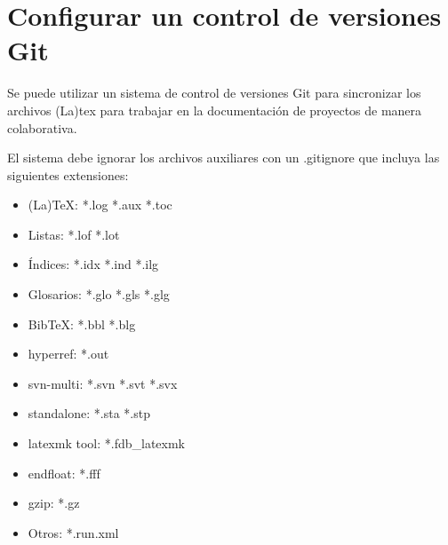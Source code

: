 \documentclass[12pt, a4paper]{article}
\begin{document}
\section{Configurar un control de versiones Git}

Se puede utilizar un sistema de control de versiones Git para sincronizar los archivos (La)tex para trabajar en la documentación de proyectos de manera colaborativa.

El sistema debe ignorar los archivos auxiliares con un .gitignore que incluya las siguientes extensiones:

\begin{itemize}
\item (La)TeX: *.log *.aux *.toc
\item Listas: *.lof *.lot
\item Índices: *.idx *.ind *.ilg
\item Glosarios: *.glo *.gls *.glg
\item BibTeX: *.bbl *.blg
\item hyperref: *.out
\item svn-multi: *.svn *.svt *.svx
\item standalone: *.sta *.stp
\item latexmk tool: *.fdb\_latexmk
\item endfloat: *.fff
\item gzip: *.gz
\item Otros: *.run.xml
\end{itemize}
\end{document}
